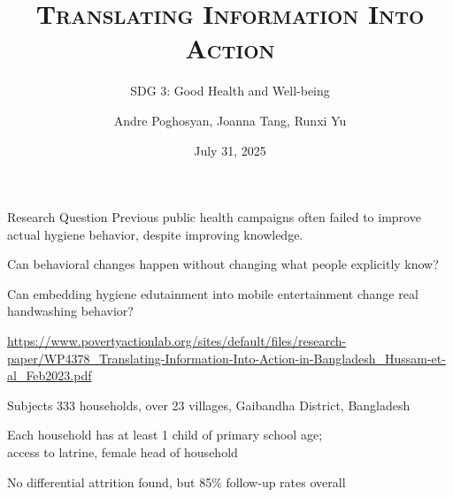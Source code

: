 \documentclass[aspectratio=169]{beamer}
\title{\scshape Translating Information Into Action}
\subtitle{SDG 3: Good Health and Well-being}
\author{Andre Poghosyan, Joanna Tang, Runxi Yu}
\date{July 31, 2025}
\begin{document}
\maketitle

\begin{frame}{Research Question}
	Previous public health campaigns often failed to improve actual hygiene behavior, despite improving knowledge.

	Can behavioral changes happen without changing what people explicitly know?

	\Large Can embedding hygiene edutainment into mobile entertainment change real handwashing behavior?

	\normalsize

	\bigskip

	\url{https://www.povertyactionlab.org/sites/default/files/research-paper/WP4378_Translating-Information-Into-Action-in-Bangladesh_Hussam-et-al_Feb2023.pdf}
\end{frame}

\begin{frame}{Subjects}
	333 households, over 23 villages, Gaibandha District, Bangladesh

	Each household has at least 1 child of primary school age;\\
	access to latrine, female head of household

	\bigskip

	No differential attrition found, but 85\% follow-up rates overall
\end{frame}
\end{document}
